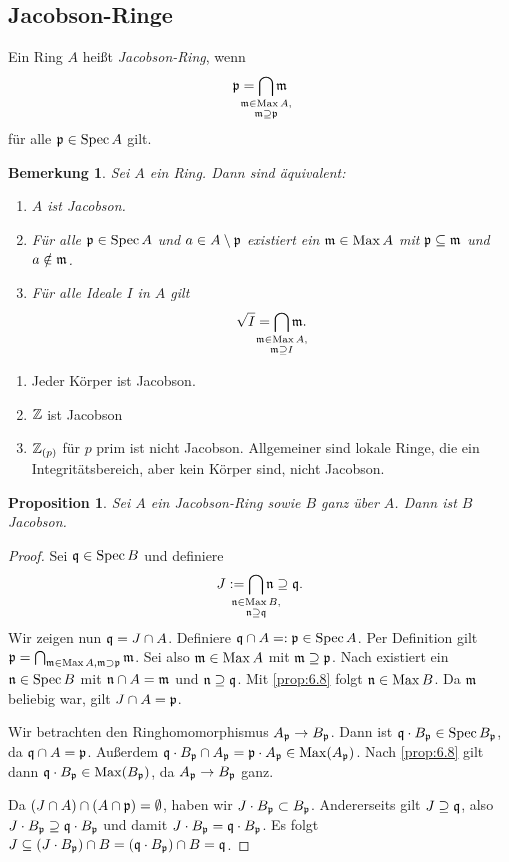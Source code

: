 \documentclass[12pt,a4paper]{scrartcl}
\theoremstyle{cplain}
\newtheorem{prop}[thmcounter]{Proposition}
\theoremstyle{cdef}
\newtheorem{beme}[thmcounter]{Bemerkung}
\begin{document}
\subsection{Jacobson-Ringe}
\begin{defi}
	Ein Ring $A$ heißt \emph{Jacobson-Ring}, wenn \[\fp = \bigcap_{\mathclap{\substack{\fm \in \Max A,\\ \fm \supseteq \fp}}} \fm\] für alle $\mathfrak{p} \in \operatorname{Spec} A$ gilt.
\end{defi}
\begin{beme} \label{bem7.19}
	Sei $A$ ein Ring. Dann sind äquivalent:
	\begin{enumerate}
		\item $A$ ist Jacobson.
		\item Für alle $\mathfrak{p} \in \operatorname{Spec} A$ und $a \in A \setminus \mathfrak{p}$ existiert ein $\mathfrak{m} \in \operatorname{Max} A$ mit $\mathfrak{p} \subseteq \mathfrak{m}$ und $a \notin \mathfrak{m}$.
		\item Für alle Ideale $I$ in $A$ gilt \[\sqrt{I}=\bigcap_{\mathclap{\substack{\fm \in \Max A,\\ \fm \supseteq I}}} \fm.\]
	\end{enumerate}
\end{beme}
\begin{bsp}
	\leavevmode
	\begin{enumerate}
		\item Jeder Körper ist Jacobson.
		\item $\mathbb Z$ ist Jacobson
		\item $\mathbb Z_{(p)}$ für $p$ prim ist nicht Jacobson. Allgemeiner sind lokale Ringe, die ein Integritätsbereich, aber kein Körper sind, nicht Jacobson.
	\end{enumerate}
\end{bsp}
\begin{prop}
	Sei $A$ ein Jacobson-Ring sowie $B$ ganz über $A$. Dann ist $B$ Jacobson.
\end{prop}
\begin{proof}
	Sei $\mathfrak{q} \in \operatorname{Spec} B$ und definiere \[J := \bigcap_{\mathclap{\substack{\fn \in \Max B,\\ \fn \supseteq \fq}}} \fn \supseteq \fq.\] Wir zeigen nun $\mathfrak{q}=J\cap A$. Definiere $\mathfrak{q} \cap A =: \mathfrak{p} \in \operatorname{Spec} A$. Per Definition gilt $\mathfrak{p}=\bigcap_{\mathfrak{m} \in \operatorname{Max} A, \mathfrak{m} \supset \mathfrak{p}} \mathfrak{m}$. Sei also $\mathfrak{m} \in \operatorname{Max} A$ mit $\mathfrak{m} \supseteq \mathfrak{p}$. Nach  existiert ein $\mathfrak{n} \in \operatorname{Spec} B$ mit $\mathfrak{n} \cap A = \mathfrak{m}$ und $\mathfrak{n} \supseteq \mathfrak{q}$. Mit \cref{prop:6.8} folgt $\mathfrak{n} \in \operatorname{Max} B$. Da $\mathfrak{m}$ beliebig war, gilt $J \cap A=\mathfrak{p}$.
	
	Wir betrachten den Ringhomomorphismus $A_{\mathfrak{p}} \to B_{\mathfrak{p}}$. Dann ist $\mathfrak{q} \cdot B_{\mathfrak{p}} \in \operatorname{Spec} B_{\mathfrak{p}}$, da $\mathfrak{q} \cap A = \mathfrak{p}$. Außerdem $\mathfrak{q} \cdot B_{\mathfrak{p}} \cap A_{\mathfrak{p}} = \mathfrak{p} \cdot A_{\mathfrak{p}} \in \operatorname{Max}(A_{\mathfrak{p}})$. Nach \cref{prop:6.8} gilt dann $\mathfrak{q} \cdot B_{\mathfrak{p}} \in \operatorname{Max}(B_{\mathfrak{p}})$, da $A_{\mathfrak{p}} \to B_{\mathfrak{p}}$ ganz.
	
	Da $(J \cap A)  \cap (A \cap \mathfrak{p})= \emptyset$, haben wir $J \cdot B_{\mathfrak{p}} \subset B_{\mathfrak{p}}$. Andererseits gilt $J \supseteq \mathfrak{q}$, also $J \cdot B_{\mathfrak{p}} \supseteq \mathfrak{q} \cdot B_{\mathfrak{p}}$ und damit $J \cdot B_{\mathfrak{p}} = \mathfrak{q} \cdot B_{\mathfrak{p}}$. Es folgt $J \subseteq (J \cdot B_{\mathfrak{p}}) \cap B = (\mathfrak{q} \cdot B_{\mathfrak{p}}) \cap B = \mathfrak{q}$.
\end{proof}
\end{document}
